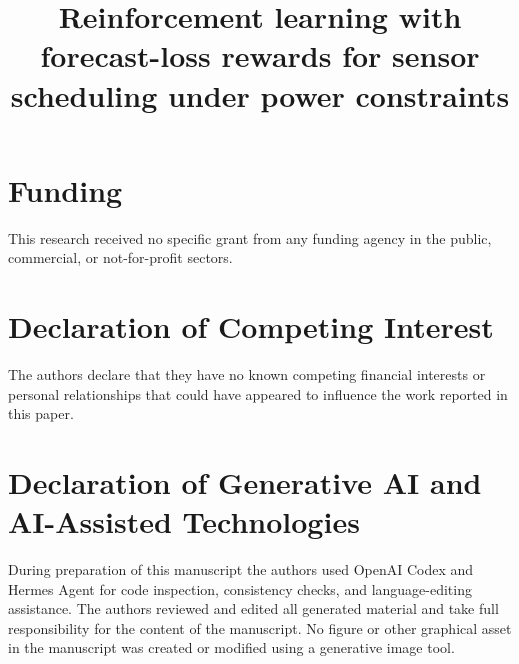 \documentclass[review,authoryear,12pt]{elsarticle}
\begin{document}
\begin{frontmatter}

\title{Reinforcement learning with forecast-loss rewards for sensor scheduling under power constraints}



\end{frontmatter}



\section*{Funding}
This research received no specific grant from any funding agency in the public,
commercial, or not-for-profit sectors.

\section*{Declaration of Competing Interest}
The authors declare that they have no known competing financial interests or
personal relationships that could have appeared to influence the work reported
in this paper.

\section*{Declaration of Generative AI and AI-Assisted Technologies}
During preparation of this manuscript the authors used OpenAI Codex and Hermes
Agent for code inspection, consistency checks, and language-editing assistance.
The authors reviewed and edited all generated material and take full responsibility for the
content of the manuscript. No figure or other graphical asset in the manuscript
was created or modified using a generative image tool.
\end{document}
